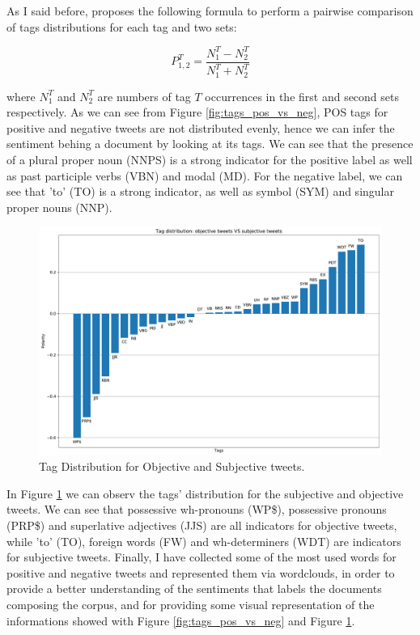 \documentclass[11pt,twocolumn]{article}
\begin{document}
        \noindent
        As I said before, \cite{twitter_as_a_corpus} proposes the following formula to perform a pairwise
        comparison of tags distributions for each tag and two sets:

        \begin{equation*}
            P_{1, 2}^T = \frac{N_1^T - N_2^T}{N_1^T + N_2^T}
        \end{equation*}

        \noindent
        where $N_1^T$ and $N_2^T$ are numbers of tag $T$ occurrences in the first and second sets respectively.
        As we can see from Figure \ref{fig:tags_pos_vs_neg}, POS tags for positive and negative tweets are not
        distributed evenly, hence we can infer the sentiment behing a document by looking at its tags. We can
        see that the presence of a plural proper noun (NNPS) is a strong indicator for the positive label as
        well as past participle verbs (VBN) and modal (MD). For the negative label, we can see that 'to' (TO)
        is a strong indicator, as well as symbol (SYM) and singular proper nouns (NNP).

        \begin{figure}[h]
            \centering
            \includegraphics[width=\linewidth]{tag_distribution_objective_vs_subjective.pdf}
            \caption{Tag Distribution for Objective and Subjective tweets.}
            \label{fig:tags_obj_vs_subj}
        \end{figure}

        \noindent
        In Figure \ref{fig:tags_obj_vs_subj} we can observ the tags' distribution for the subjective and
        objective tweets. We can see that possessive wh-pronouns (WP\$), possessive pronouns (PRP\$) and
        superlative adjectives (JJS) are all indicators for objective tweets, while 'to' (TO), foreign words
        (FW) and wh-determiners (WDT) are indicators for subjective tweets. Finally, I have collected some of
        the most used words for positive and negative tweets and represented them via wordclouds, in order to
        provide a better understanding of the sentiments that labels the documents composing the corpus, and for
        providing some visual representation of the informations showed with Figure \ref{fig:tags_pos_vs_neg}
        and Figure \ref{fig:tags_obj_vs_subj}.
\end{document}
